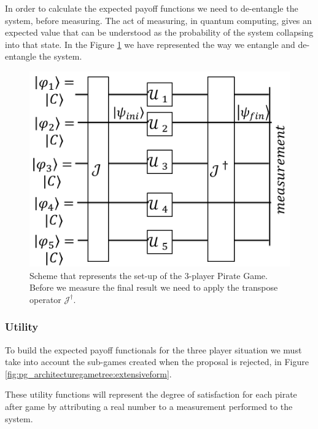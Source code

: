 \documentclass[10pt,twocolumn]{llncs}
\begin{document}
In order to calculate the expected payoff functions we need to de-entangle the system, before measuring. The act of measuring, in quantum computing, gives an expected value that can be understood as the probability of the system collapsing into that state. In the Figure \ref{fig:pg_architecture3players} we have represented the way we entangle and de-entangle the system.

\begin{figure}[h]
\centering 
\includegraphics[scale=0.14]{Figures/architecture/esquema/esquema.png}
\caption{Scheme that represents the set-up of the $3$-player Pirate Game. Before we measure the final result we need to apply the transpose operator $\mathcal{J}^{\dagger}$. }
\label{fig:pg_architecture3players}
\end{figure}






\subsubsection{Utility}
\label{subsec:pirates_utility}

To build the expected payoff functionals for the three player situation we must take into account the sub-games created when the proposal is rejected, in Figure \ref{fig:pg_architecturegametree:extensiveform}.


These utility functions will represent the degree of satisfaction for each pirate after game by attributing a real number to a measurement performed to the system.
\end{document}
